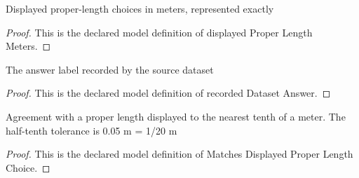 \begin{definition}
  \label{def:physics:phyx-mini-0650:phyxminiproblems-problemphyxmini0650-displayedproperlengthmeters}
  Displayed proper-length choices in meters, represented exactly
\end{definition}
\begin{proof}
  This is the declared model definition of displayed Proper Length Meters.
\end{proof}
\begin{definition}
  \label{def:physics:phyx-mini-0650:phyxminiproblems-problemphyxmini0650-recordeddatasetanswer}
  The answer label recorded by the source dataset
\end{definition}
\begin{proof}
  This is the declared model definition of recorded Dataset Answer.
\end{proof}
\begin{definition}
  \label{def:physics:phyx-mini-0650:phyxminiproblems-problemphyxmini0650-matchesdisplayedproperlengthchoice}
  Agreement with a proper length displayed to the nearest tenth of a meter. The half-tenth tolerance is 0.05 m = 1/20 m
\end{definition}
\begin{proof}
  This is the declared model definition of Matches Displayed Proper Length Choice.
\end{proof}
